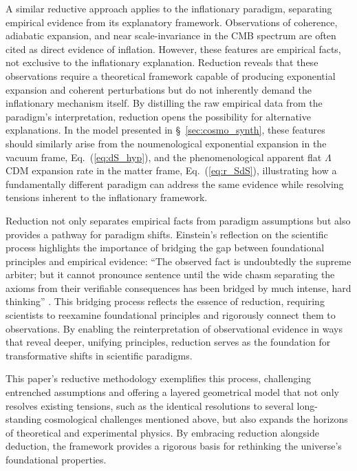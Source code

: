 \documentclass[aps,rmp,groupedaddress,twocolumn,10pt]{revtex4-2}
\begin{document}
A similar reductive approach applies to the inflationary paradigm, separating empirical evidence from its explanatory framework. Observations of coherence, adiabatic expansion, and near scale-invariance in the CMB spectrum are often cited as direct evidence of inflation. However, these features are empirical facts, not exclusive to the inflationary explanation. Reduction reveals that these observations require a theoretical framework capable of producing exponential expansion and coherent perturbations but do not inherently demand the inflationary mechanism itself. By distilling the raw empirical data from the paradigm's interpretation, reduction opens the possibility for alternative explanations. In the model presented in \S~\ref{sec:cosmo_synth}, these features should similarly arise from the noumenological exponential expansion in the vacuum frame, Eq.~(\ref{eq:dS_hyp}), and the phenomenological apparent flat $\Lambda$CDM expansion rate in the matter frame, Eq.~(\ref{eq:r_SdS}), illustrating how a fundamentally different paradigm can address the same evidence while resolving tensions inherent to the inflationary framework.

Reduction not only separates empirical facts from paradigm assumptions but also provides a pathway for paradigm shifts. Einstein's reflection on the scientific process highlights the importance of bridging the gap between foundational principles and empirical evidence: ``The observed fact is undoubtedly the supreme arbiter; but it cannot pronounce sentence until the wide chasm separating the axioms from their verifiable consequences has been bridged by much intense, hard thinking'' \cite{Einstein1954}. This bridging process reflects the essence of reduction, requiring scientists to reexamine foundational principles and rigorously connect them to observations. By enabling the reinterpretation of observational evidence in ways that reveal deeper, unifying principles, reduction serves as the foundation for transformative shifts in scientific paradigms.

This paper's reductive methodology exemplifies this process, challenging entrenched assumptions and offering a layered geometrical model that not only resolves existing tensions, such as the identical resolutions to several long-standing cosmological challenges mentioned above, but also expands the horizons of theoretical and experimental physics. By embracing reduction alongside deduction, the framework provides a rigorous basis for rethinking the universe's foundational properties.
\end{document}
